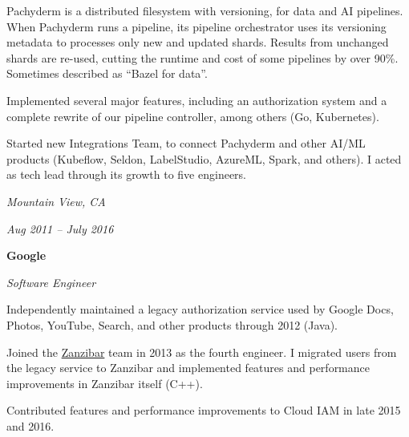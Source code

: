 \documentclass[10pt, letterpaper]{article}
\begin{document}
\vspace{0.1 cm}

\begin{onecolentry}
    \begin{highlights}
        \item Pachyderm is a distributed filesystem with versioning, for data and AI pipelines. When Pachyderm runs a pipeline, its pipeline orchestrator uses its versioning metadata to processes only new and updated shards. Results from unchanged shards are re-used, cutting the runtime and cost of some pipelines by over 90\%. Sometimes described as ``Bazel for data''.
        \item Implemented several major features, including an authorization system and a complete rewrite of our pipeline controller, among others (Go, Kubernetes).
        \item Started new Integrations Team, to connect Pachyderm and other AI/ML products (Kubeflow, Seldon, LabelStudio, AzureML, Spark, and others). I acted as tech lead through its growth to five engineers.
    \end{highlights}
  \end{onecolentry}

\vspace{0.2 cm}

\begin{twocolentry}{
    \textit{Mountain View, CA}

    \textit{Aug 2011 – July 2016}
}
    \textbf{Google}

    \textit{Software Engineer}
\end{twocolentry}

\vspace{0.1 cm}
\begin{onecolentry}
    \begin{highlights}
        \item Independently maintained a legacy authorization service used by Google Docs, Photos, YouTube, Search, and other products through 2012 (Java).
        \item Joined the \href{https://research.google/pubs/zanzibar-googles-consistent-global-authorization-system/}{Zanzibar} team in 2013 as the fourth engineer. I migrated users from the legacy service to Zanzibar and implemented features and performance improvements in Zanzibar itself (C++).
        \item Contributed features and performance improvements to Cloud IAM in late 2015 and 2016.
    \end{highlights}
\end{onecolentry}
\end{document}
